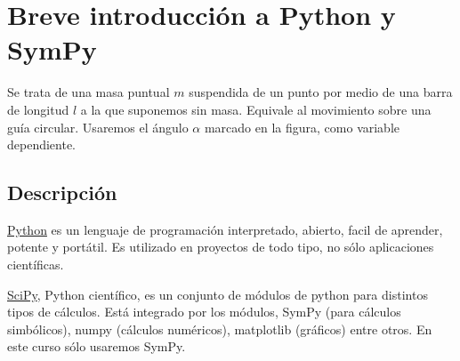 
\chapter{Breve introducci\'on a Python y SymPy}


  Se trata de una masa puntual $m$ suspendida de un punto por medio de una barra de longitud $l$
 a la que suponemos sin masa. Equivale al movimiento sobre una guía circular.  Usaremos el ángulo $\alpha$ marcado en la figura, como variable dependiente.


\section{Descripción}
\href{https://www.python.org/}{Python} es un lenguaje de programación interpretado, 
abierto, facil de aprender, potente y portátil. Es utilizado en proyectos de todo tipo, 
no sólo aplicaciones científicas.



\href{http://www.scipy.org/}{SciPy}, 
Python científico, es un conjunto de módulos de python para distintos tipos de cálculos. 
Está integrado por los módulos, SymPy (para cálculos simbólicos), 
numpy (cálculos numéricos), matplotlib (gráficos) entre otros.  
En este curso sólo usaremos SymPy.



